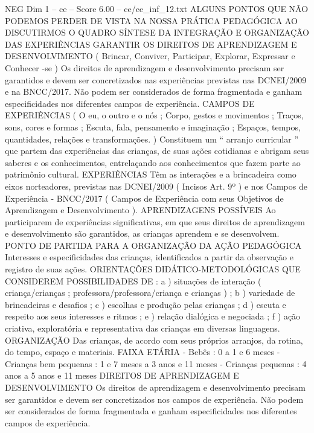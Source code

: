 \begin{textsample}{NEG Dim 1 – ce – Score 6.00 – ce/ce\_inf\_12.txt}  \label{ex:f1_neg_250}
ALGUNS PONTOS QUE NÃO PODEMOS PERDER DE VISTA NA NOSSA PRÁTICA PEDAGÓGICA AO DISCUTIRMOS O QUADRO SÍNTESE DA INTEGRAÇÃO E ORGANIZAÇÃO DAS EXPERIÊNCIAS GARANTIR OS DIREITOS DE APRENDIZAGEM E DESENVOLVIMENTO ( Brincar, Conviver, Participar, Explorar, Expressar e Conhecer -se ) Os direitos de aprendizagem e desenvolvimento precisam ser garantidos e devem ser concretizados nas experiências previstas nas DCNEI/2009 e na BNCC/2017.
Não podem ser considerados de forma fragmentada e ganham especificidades nos diferentes campos de experiência.
CAMPOS DE EXPERIÊNCIAS ( O eu, o outro e o nós ; Corpo, gestos e movimentos ; Traços, sons, cores e formas ; Escuta, fala, pensamento e imaginação ; Espaços, tempos, quantidades, relações e transformações. ) Constituem um “ arranjo curricular ” que partem das experiências das crianças, de suas ações cotidianas e abrigam seus saberes e os conhecimentos, entrelaçando aos conhecimentos que fazem parte ao patrimônio cultural.
EXPERIÊNCIAS Têm as interações e a brincadeira como eixos norteadores, previstas nas DCNEI/2009 ( Incisos Art. 9º ) e nos Campos de Experiência - BNCC/2017 ( Campos de Experiência com seus Objetivos de Aprendizagem e Desenvolvimento ).
APRENDIZAGENS POSSÍVEIS Ao participarem de experiências significativas, em que seus direitos de aprendizagem e desenvolvimento são garantidos, as crianças aprendem e se desenvolvem.
PONTO DE PARTIDA PARA A ORGANIZAÇÃO DA AÇÃO PEDAGÓGICA Interesses e especificidades das crianças, identificados a partir da observação e registro de suas ações.
ORIENTAÇÕES DIDÁTICO-METODOLÓGICAS QUE CONSIDEREM POSSIBILIDADES DE : a ) situações de interação ( criança/crianças ; professora/professora/criança e crianças ) ; b ) variedade de brincadeiras e desafios ; c ) escolhas e produção pelas crianças ; d ) escuta e respeito aos seus interesses e ritmos ; e ) relação dialógica e negociada ; f ) ação criativa, exploratória e representativa das crianças em diversas linguagens.
ORGANIZAÇÃO Das crianças, de acordo com seus próprios arranjos, da rotina, do tempo, espaço e materiais.
FAIXA ETÁRIA - Bebês : 0 a 1 e 6 meses - Crianças bem pequenas : 1 e 7 meses a 3 anos e 11 meses - Crianças pequenas : 4 anos a 5 anos e 11 meses DIREITOS DE APRENDIZAGEM E DESENVOLVIMENTO Os direitos de aprendizagem e desenvolvimento precisam ser garantidos e devem ser concretizados nos campos de experiência.
Não podem ser considerados de forma fragmentada e ganham especificidades nos diferentes campos de experiência.

\end{textsample}
